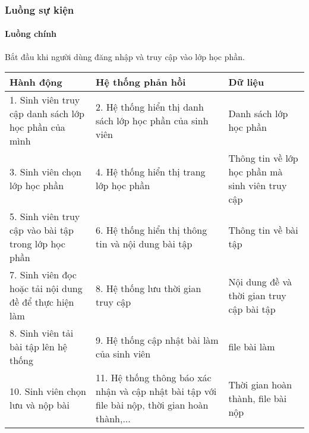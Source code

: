 \documentclass[./../main_file.tex]{subfiles}
\begin{document}
\subsubsection{Luồng sự kiện}
\paragraph{Luồng chính}
Bắt đầu khi người dùng đăng nhập và truy cập vào lớp học phần.
\begin{table}[H]
				\begin{tabular}{|p{.33\textwidth}|p{}|p{}|}
		\hline
		\textbf{Hành động}                                     & \textbf{Hệ thống phản hồi}                                & \textbf{Dữ liệu}                                \\ \hline
		1. Sinh viên truy cập danh sách lớp học phần của mình  & 2. Hệ thống hiển thị danh sách lớp học phần của sinh viên & Danh sách lớp học phần                          \\ \hline
		3. Sinh viên chọn lớp học phần                         & 4.  Hệ thống hiển thị trang lớp học phần                  & Thông tin về lớp học phần mà sinh viên truy cập \\ \hline
		5. Sinh viên truy cập vào bài tập trong lớp học phần   & 6. Hệ thống hiển thị thông tin và nội dung bài tập        & Thông tin về bài tập                            \\ \hline
		7. Sinh viên đọc hoặc tải nội dung đề để thực hiện làm & 8. Hệ thống lưu thời gian truy cập                        & Nội dung đề và thời gian truy cập bài tập       \\ \hline
		8. Sinh viên tải bài tập lên hệ thống                  & 9. Hệ thống cập nhật bài làm của sinh viên                & file bài làm                                    \\ \hline
		10. Sinh viên chọn lưu và nộp bài & 11. Hệ thống thông báo xác nhận và cập nhật bài tập với file bài nộp, thời gian hoàn thành,... & Thời gian hoàn thành, file bài nộp \\ \hline
	\end{tabular}
\end{table}
\end{document}
